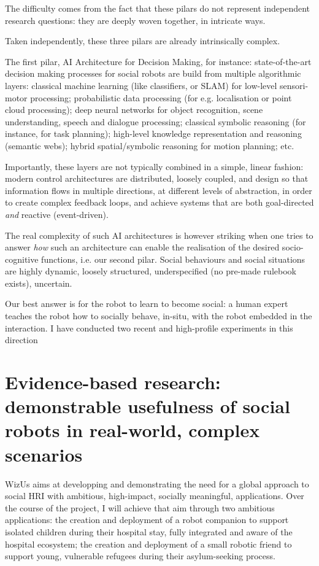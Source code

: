 \documentclass[11pt]{report}
\newcommand{\project}{WizUs\xspace}
\begin{document}
The difficulty comes from the fact that these pilars do not represent independent
research questions: they are deeply woven together, in intricate ways.


Taken independently, these three pilars are already intrinsically complex.

The first pilar, AI Architecture for Decision Making, for instance:
state-of-the-art decision making processes for social robots are build from
multiple algorithmic layers: classical machine learning (like classifiers, or
SLAM) for low-level sensori-motor processing; probabilistic data processing (for
e.g. localisation or point cloud processing); deep neural networks for object
recognition, scene understanding, speech and dialogue processing; classical
symbolic reasoning (for instance, for task planning); high-level knowledge
representation and reasoning (semantic webs); hybrid spatial/symbolic reasoning
for motion planning; etc.

Importantly, these layers are not typically combined in a simple, linear
fashion: modern control architectures are distributed, loosely coupled, and
design so that information flows in multiple directions, at different levels of
abstraction, in order to create complex feedback loops, and achieve systems that are
both goal-directed \emph{and} reactive (event-driven).


The real complexity of such AI architectures is however striking when one tries
to answer \emph{how} such an architecture can enable the realisation of the
desired socio-cognitive functions, i.e. our second pilar. Social behaviours and
social situations are highly dynamic, loosely structured, underspecified (no
pre-made rulebook exists), uncertain.

Our best answer is for the robot to learn to become social: a human expert teaches
the robot how to socially behave, in-situ, with the robot embedded in the
interaction. I have conducted two recent and high-profile experiments in this
direction

\section{Evidence-based research: demonstrable usefulness of social robots in
real-world, complex scenarios}

\project aims at developping and demonstrating the need for a global approach to
social HRI with ambitious, high-impact, socially meaningful, applications. Over
the course of the project, I will achieve that aim through two ambitious
applications: the creation and deployment of a robot companion to support
isolated children during their hospital stay, fully integrated and aware of the
hospital ecosystem; the creation and deployment of a small robotic friend to
support young, vulnerable refugees during their asylum-seeking process.
\end{document}
